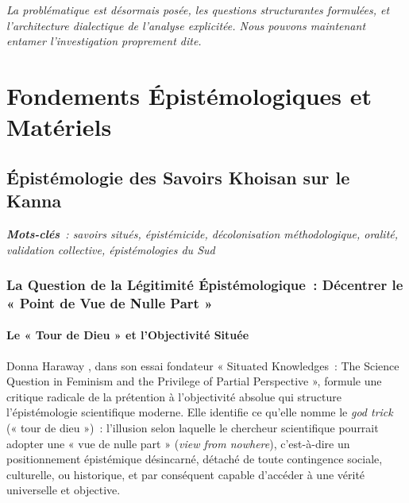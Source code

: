 \documentclass[12pt,a4paper,twoside]{book}
\begin{document}
\textit{La problématique est désormais posée, les questions structurantes formulées, et l'architecture dialectique de l'analyse explicitée. Nous pouvons maintenant entamer l'investigation proprement dite.}

\clearpage


\part{Fondements Épistémologiques et Matériels}


\chapter{Épistémologie des Savoirs Khoisan sur le Kanna}

\textit{\textbf{Mots-clés}~: savoirs situés, épistémicide, décolonisation méthodologique, oralité, validation collective, épistémologies du Sud}

\section{La Question de la Légitimité Épistémologique~: Décentrer le « Point de Vue de Nulle Part »}

\subsection{Le « Tour de Dieu » et l'Objectivité Située}

Donna Haraway \parencite{haraway1988}, dans son essai fondateur « Situated Knowledges~: The Science Question in Feminism and the Privilege of Partial Perspective », formule une critique radicale de la prétention à l'objectivité absolue qui structure l'épistémologie scientifique moderne. Elle identifie ce qu'elle nomme le \textit{god trick} (« tour de dieu »)~: l'illusion selon laquelle le chercheur scientifique pourrait adopter une « vue de nulle part » (\textit{view from nowhere}), c'est-à-dire un positionnement épistémique désincarné, détaché de toute contingence sociale, culturelle, ou historique, et par conséquent capable d'accéder à une vérité universelle et objective.
\end{document}
